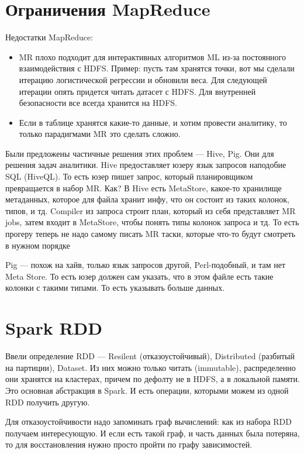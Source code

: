 
\section{Ограничения MapReduce}

Недостатки MapReduce:
\begin{itemize}
    \item MR плохо подходит для интерактивных алгоритмов ML из-за постоянного взаимодействия с HDFS. Пример: пусть там хранятся точки, вот мы сделали итерацию логистической регрессии и обновили веса. Для следующей итерации опять придется читать датасет с HDFS. Для внутренней безопасности все всегда хранится на HDFS.
    \item Если в таблице хранятся какие-то данные, и хотим провести аналитику, то только парадигмами MR это сделать сложно. 
\end{itemize}

Были предложены частичные решения этих проблем --- Hive, Pig. Они для решения задач аналитики. Hive предоставляет юзеру язык запросов наподобие SQL (HiveQL). То есть юзер пишет запрос, который планировщиком превращается в набор MR. Как? В Hive есть MetaStore, какое-то хранилище метаданных, которое для файла хранит инфу, что он состоит из таких колонок, типов, и тд. Compiler из запроса строит план, который из себя представляет MR jobs, затем входит в MetaStore, чтобы понять типы колонок запроса и тд. То есть прогеру теперь не надо самому писать MR таски, которые что-то будут смотреть в нужном порядке

Pig --- похож на хайв, только язык запросов другой, Perl-подобный, и там нет Meta Store. То есть юзер должен сам указать, что в этом файле есть такие колонки с такими типами. То есть указывать больше данных. 

\section{Spark RDD}

Ввели определение RDD --- Resilent (отказоустойчивый), Distributed (разбитый на партиции), Dataset. Из них можно только читать (immutable), распределенно они хранятся на кластерах, причем по дефолту не в HDFS, а в локальной памяти. Это основная абстракция в Spark. И есть операции, которыми можем из одной RDD получить другую.

Для отказоустойчивости надо запоминать граф вычислений: как из набора RDD получаем интересующую. И если есть такой граф, и часть данных была потеряна, то для восстановления нужно просто пройти по графу зависимостей.

